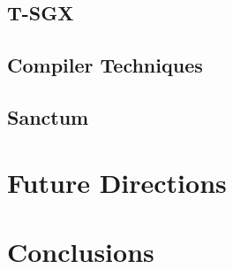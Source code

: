 \subsection{T-SGX}

\subsection{Compiler Techniques}

\subsection{Sanctum}

\section{Future Directions}

\section{Conclusions}
